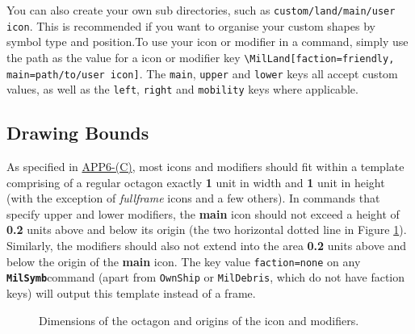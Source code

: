 \documentclass[a4paper, titlepage]{article}
\newcommand\MilSymb{\textbf{\texttt{MilSymb}}}
\newcommand\DocLink{\href{https://web.archive.org/web/20150921231042/http://armawiki.zumorc.de/files/NATO/APP-6(C).pdf}{APP6-(C)}}
\begin{document}
You can also create your own sub directories, such as \texttt{custom/land/main/user icon}. This is recommended if you want to organise your custom shapes by symbol type and position.To use your icon or modifier in a command, simply use the path as the value for a icon or modifier key \texttt{\textbackslash MilLand[faction=friendly, main=path/to/user icon]}. The \texttt{main}, \texttt{upper} and \texttt{lower} keys all accept custom values, as well as the \texttt{left}, \texttt{right} and \texttt{mobility} keys where applicable.

\subsection{Drawing Bounds}

As specified in \DocLink, most icons and modifiers should fit within a template comprising of a regular octagon exactly \textbf{1} unit in width and \textbf{1} unit in height (with the exception of \textit{fullframe} icons and a few others). In commands that specify upper and lower modifiers, the \textbf{main} icon should not exceed a height of \textbf{0.2} units above and below its origin (the two horizontal dotted line in Figure \ref{octagon}). Similarly, the modifiers should also not extend into the area \textbf{0.2} units above and below the origin of the \textbf{main} icon. The key value \texttt{faction=none} on any \MilSymb command (apart from \texttt{OwnShip} or \texttt{MilDebris}, which do not have faction keys) will output this template instead of a frame.

\begin{figure}[H]
\centering
{}
\caption{Dimensions of the octagon and origins of the icon and modifiers.}
\label{octagon}
\end{figure}
\end{document}
